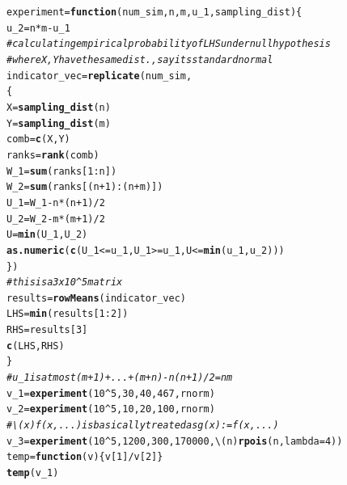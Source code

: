 \documentclass[12pt, english]{article}\usepackage[]{graphicx}\usepackage[]{xcolor}
\makeatletter
\newcommand{\hlnum}[1]{\textcolor[rgb]{0.686,0.059,0.569}{#1}}%
\newcommand{\hlcom}[1]{\textcolor[rgb]{0.678,0.584,0.686}{\textit{#1}}}%
\newcommand{\hlopt}[1]{\textcolor[rgb]{0,0,0}{#1}}%
\newcommand{\hldef}[1]{\textcolor[rgb]{0.345,0.345,0.345}{#1}}%
\newcommand{\hlkwa}[1]{\textcolor[rgb]{0.161,0.373,0.58}{\textbf{#1}}}%
\newcommand{\hlkwb}[1]{\textcolor[rgb]{0.69,0.353,0.396}{#1}}%
\newcommand{\hlkwc}[1]{\textcolor[rgb]{0.333,0.667,0.333}{#1}}%
\newcommand{\hlkwd}[1]{\textcolor[rgb]{0.737,0.353,0.396}{\textbf{#1}}}%
\newenvironment{kframe}{%
 \def\at@end@of@kframe{}%
 \ifinner\ifhmode%
  \def\at@end@of@kframe{\end{minipage}}%
  \begin{minipage}{\columnwidth}%
 \fi\fi%
 \def\FrameCommand##1{\hskip\@totalleftmargin \hskip-\fboxsep
 \colorbox{shadecolor}{##1}\hskip-\fboxsep
     \hskip-\linewidth \hskip-\@totalleftmargin \hskip\columnwidth}%
 \MakeFramed {\advance\hsize-\width
   \@totalleftmargin\z@ \linewidth\hsize
   \@setminipage}}%
 {\par\unskip\endMakeFramed%
 \at@end@of@kframe}
\newenvironment{knitrout}{}{} %
\makeatother
\begin{document}
\begin{enumerate}[label=\arabic*.]
\begin{enumerate}[label=(\alph*)]
\begin{knitrout}
\color{fgcolor}\begin{kframe}
\begin{alltt}
\hldef{experiment} \hlkwb{=} \hlkwa{function}\hldef{(}\hlkwc{num_sim}\hldef{,}\hlkwc{n}\hldef{,}\hlkwc{m}\hldef{,}\hlkwc{u_1}\hldef{,}\hlkwc{sampling_dist}\hldef{) \{}
\hldef{u_2} \hlkwb{=} \hldef{n}\hlopt{*}\hldef{m} \hlopt{-} \hldef{u_1}
\hlcom{#calculating empirical probability of LHS under null hypothesis}
\hlcom{#where X,Y have the same dist., say its standard normal}
\hldef{indicator_vec} \hlkwb{=} \hlkwd{replicate}\hldef{(num_sim,}
\hldef{\{}
\hldef{X}\hlkwb{=}\hlkwd{sampling_dist}\hldef{(n)}
\hldef{Y}\hlkwb{=}\hlkwd{sampling_dist}\hldef{(m)}
\hldef{comb} \hlkwb{=} \hlkwd{c}\hldef{(X,Y)}
\hldef{ranks} \hlkwb{=} \hlkwd{rank}\hldef{(comb)}
\hldef{W_1} \hlkwb{=} \hlkwd{sum}\hldef{(ranks[}\hlnum{1}\hlopt{:}\hldef{n])}
\hldef{W_2} \hlkwb{=} \hlkwd{sum}\hldef{(ranks[(n}\hlopt{+}\hlnum{1}\hldef{)}\hlopt{:}\hldef{(n}\hlopt{+}\hldef{m)])}
\hldef{U_1} \hlkwb{=} \hldef{W_1} \hlopt{-} \hldef{n}\hlopt{*}\hldef{(n}\hlopt{+}\hlnum{1}\hldef{)}\hlopt{/}\hlnum{2}
\hldef{U_2} \hlkwb{=} \hldef{W_2} \hlopt{-} \hldef{m}\hlopt{*}\hldef{(m}\hlopt{+}\hlnum{1}\hldef{)}\hlopt{/}\hlnum{2}
\hldef{U} \hlkwb{=} \hlkwd{min}\hldef{(U_1,U_2)}
\hlkwd{as.numeric}\hldef{(}\hlkwd{c}\hldef{(U_1} \hlopt{<=} \hldef{u_1, U_1} \hlopt{>=} \hldef{u_1, U} \hlopt{<=} \hlkwd{min}\hldef{(u_1,u_2)))}
\hldef{\})}
\hlcom{#this is a 3x10^5 matrix}
\hldef{results} \hlkwb{=} \hlkwd{rowMeans}\hldef{(indicator_vec)}
\hldef{LHS} \hlkwb{=} \hlkwd{min}\hldef{(results[}\hlnum{1}\hlopt{:}\hlnum{2}\hldef{])}
\hldef{RHS} \hlkwb{=} \hldef{results[}\hlnum{3}\hldef{]}
\hlkwd{c}\hldef{(LHS,RHS)}
\hldef{\}}
\hlcom{#u_1 is atmost (m+1)+...+(m+n)-n(n+1)/2 = nm}
\hldef{v_1}\hlkwb{=}\hlkwd{experiment}\hldef{(}\hlnum{10}\hlopt{^}\hlnum{5}\hldef{,}\hlnum{30}\hldef{,}\hlnum{40}\hldef{,}\hlnum{467}\hldef{,rnorm)}
\hldef{v_2}\hlkwb{=}\hlkwd{experiment}\hldef{(}\hlnum{10}\hlopt{^}\hlnum{5}\hldef{,}\hlnum{10}\hldef{,}\hlnum{20}\hldef{,}\hlnum{100}\hldef{,rnorm)}
\hlcom{# \textbackslash{}(x) f(x,...) is basically treated as g(x):=f(x,...)}
\hldef{v_3}\hlkwb{=}\hlkwd{experiment}\hldef{(}\hlnum{10}\hlopt{^}\hlnum{5}\hldef{,}\hlnum{1200}\hldef{,}\hlnum{300}\hldef{,}\hlnum{170000}\hldef{,\textbackslash{}(}\hlkwc{n}\hldef{)} \hlkwd{rpois}\hldef{(n,}\hlkwc{lambda}\hldef{=}\hlnum{4}\hldef{))}
\hldef{temp} \hlkwb{=} \hlkwa{function}\hldef{(}\hlkwc{v}\hldef{) \{v[}\hlnum{1}\hldef{]}\hlopt{/}\hldef{v[}\hlnum{2}\hldef{]\}}
\hlkwd{temp}\hldef{(v_1)}
\end{alltt}

\end{kframe}
\end{knitrout}
\end{enumerate}
\end{enumerate}
\end{document}
